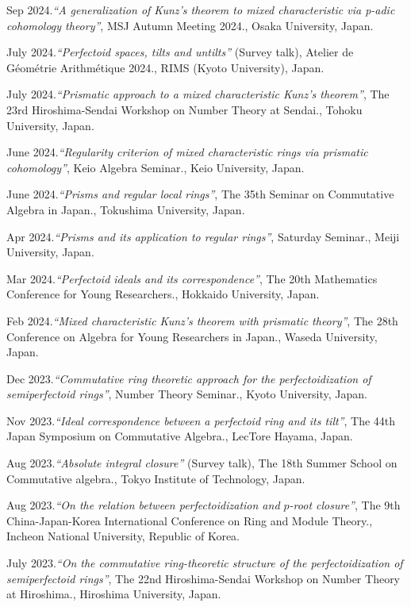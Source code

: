 \documentclass[10pt,a4paper,sans]{moderncv}
\begin{document}
\begin{etaremune}
  \item Sep 2024.\emph{``A generalization of Kunz's theorem to mixed characteristic via p-adic cohomology theory''}, \textsf{MSJ Autumn Meeting 2024.}, Osaka University, Japan.
  \item July 2024.\emph{``Perfectoid spaces, tilts and untilts''} (Survey talk), \textsf{Atelier de Géométrie Arithmétique 2024.}, RIMS (Kyoto University), Japan.
  \item July 2024.\emph{``Prismatic approach to a mixed characteristic Kunz's theorem''}, \textsf{The 23rd Hiroshima-Sendai Workshop on Number Theory at Sendai.}, Tohoku University, Japan.
  \item June 2024.\emph{``Regularity criterion of mixed characteristic rings via prismatic cohomology''}, \textsf{Keio Algebra Seminar.}, Keio University, Japan.
  \item June 2024.\emph{``Prisms and regular local rings''}, \textsf{The 35th Seminar on Commutative Algebra in Japan.}, Tokushima University, Japan.
  \item Apr 2024.\emph{``Prisms and its application to regular rings''}, \textsf{Saturday Seminar.}, Meiji University, Japan.
  \item Mar 2024.\emph{``Perfectoid ideals and its correspondence''}, \textsf{The 20th Mathematics Conference for Young Researchers.}, Hokkaido University, Japan.
  \item Feb 2024.\emph{``Mixed characteristic Kunz's theorem with prismatic theory''}, \textsf{The 28th Conference on Algebra for Young Researchers in Japan.}, Waseda University, Japan.
  \item Dec 2023.\emph{``Commutative ring theoretic approach for the perfectoidization of semiperfectoid rings''}, \textsf{Number Theory Seminar.}, Kyoto University, Japan.
  \item Nov 2023.\emph{``Ideal correspondence between a perfectoid ring and its tilt''}, \textsf{The 44th Japan Symposium on Commutative Algebra.}, LecTore Hayama, Japan.
  \item Aug 2023.\emph{``Absolute integral closure''} (Survey talk), \textsf{The 18th Summer School on Commutative algebra.}, Tokyo Institute of Technology, Japan.
  \item Aug 2023.\emph{``On the relation between perfectoidization and \(p\)-root closure''}, \textsf{The 9th China-Japan-Korea International Conference on Ring and Module Theory.}, Incheon National University, Republic of Korea.
  \item July 2023.\emph{``On the commutative ring-theoretic structure of the perfectoidization of semiperfectoid rings''}, \textsf{The 22nd Hiroshima-Sendai Workshop on Number Theory at Hiroshima.}, Hiroshima University, Japan.

\end{etaremune}
\end{document}
